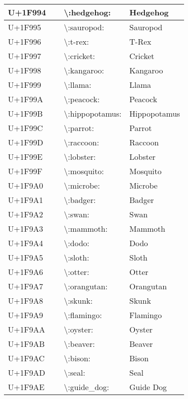 \begin{table}[h]
\begin{tabulary}{\linewidth}{|L|L|L|L|}
\hline
U+1F994 & 🦔 & {\textbackslash}:hedgehog: & Hedgehog \\
\hline
U+1F995 & 🦕 & {\textbackslash}:sauropod: & Sauropod \\
\hline
U+1F996 & 🦖 & {\textbackslash}:t-rex: & T-Rex \\
\hline
U+1F997 & 🦗 & {\textbackslash}:cricket: & Cricket \\
\hline
U+1F998 & 🦘 & {\textbackslash}:kangaroo: & Kangaroo \\
\hline
U+1F999 & 🦙 & {\textbackslash}:llama: & Llama \\
\hline
U+1F99A & 🦚 & {\textbackslash}:peacock: & Peacock \\
\hline
U+1F99B & 🦛 & {\textbackslash}:hippopotamus: & Hippopotamus \\
\hline
U+1F99C & 🦜 & {\textbackslash}:parrot: & Parrot \\
\hline
U+1F99D & 🦝 & {\textbackslash}:raccoon: & Raccoon \\
\hline
U+1F99E & 🦞 & {\textbackslash}:lobster: & Lobster \\
\hline
U+1F99F & 🦟 & {\textbackslash}:mosquito: & Mosquito \\
\hline
U+1F9A0 & 🦠 & {\textbackslash}:microbe: & Microbe \\
\hline
U+1F9A1 & 🦡 & {\textbackslash}:badger: & Badger \\
\hline
U+1F9A2 & 🦢 & {\textbackslash}:swan: & Swan \\
\hline
U+1F9A3 & 🦣 & {\textbackslash}:mammoth: & Mammoth \\
\hline
U+1F9A4 & 🦤 & {\textbackslash}:dodo: & Dodo \\
\hline
U+1F9A5 & 🦥 & {\textbackslash}:sloth: & Sloth \\
\hline
U+1F9A6 & 🦦 & {\textbackslash}:otter: & Otter \\
\hline
U+1F9A7 & 🦧 & {\textbackslash}:orangutan: & Orangutan \\
\hline
U+1F9A8 & 🦨 & {\textbackslash}:skunk: & Skunk \\
\hline
U+1F9A9 & 🦩 & {\textbackslash}:flamingo: & Flamingo \\
\hline
U+1F9AA & 🦪 & {\textbackslash}:oyster: & Oyster \\
\hline
U+1F9AB & 🦫 & {\textbackslash}:beaver: & Beaver \\
\hline
U+1F9AC & 🦬 & {\textbackslash}:bison: & Bison \\
\hline
U+1F9AD & 🦭 & {\textbackslash}:seal: & Seal \\
\hline
U+1F9AE & 🦮 & {\textbackslash}:guide\_dog: & Guide Dog \\

\end{tabulary}
\end{table}
